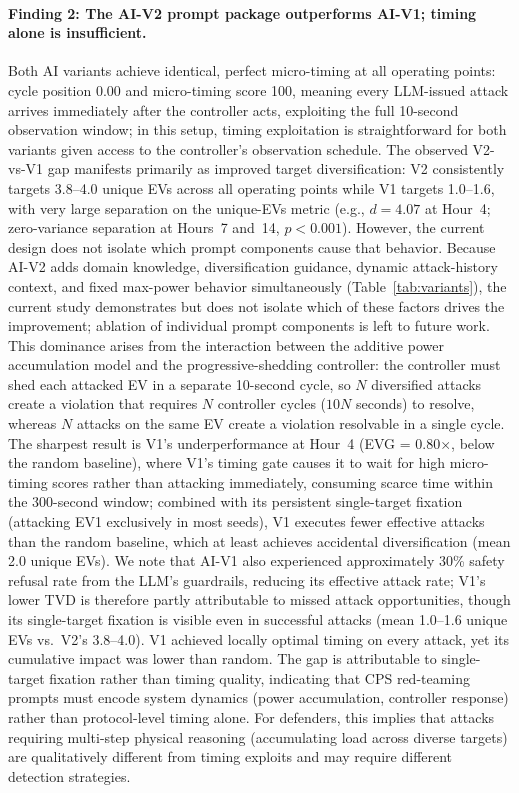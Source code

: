 \paragraph{Finding 2: The AI-V2 prompt package outperforms AI-V1; timing alone is insufficient.}
Both AI variants achieve identical, perfect micro-timing at all operating points: cycle position 0.00 and micro-timing score 100, meaning every LLM-issued attack arrives immediately after the controller acts, exploiting the full 10-second observation window; in this setup, timing exploitation is straightforward for both variants given access to the controller's observation schedule.
The observed V2-vs-V1 gap manifests primarily as improved target diversification: V2 consistently targets 3.8--4.0 unique EVs across all operating points while V1 targets 1.0--1.6, with very large separation on the unique-EVs metric (e.g., $d = 4.07$ at Hour~4; zero-variance separation at Hours~7 and~14, $p < 0.001$). However, the current design does not isolate which prompt components cause that behavior.
Because AI-V2 adds domain knowledge, diversification guidance, dynamic attack-history context, and fixed max-power behavior simultaneously (Table~\ref{tab:variants}), the current study demonstrates but does not isolate which of these factors drives the improvement; ablation of individual prompt components is left to future work.
This dominance arises from the interaction between the additive power accumulation model and the progressive-shedding controller: the controller must shed each attacked EV in a separate 10-second cycle, so $N$ diversified attacks create a violation that requires $N$ controller cycles ($10N$ seconds) to resolve, whereas $N$ attacks on the same EV create a violation resolvable in a single cycle.
The sharpest result is V1's underperformance at Hour~4 (EVG = 0.80$\times$, below the random baseline), where V1's timing gate causes it to wait for high micro-timing scores rather than attacking immediately, consuming scarce time within the 300-second window; combined with its persistent single-target fixation (attacking EV1 exclusively in most seeds), V1 executes fewer effective attacks than the random baseline, which at least achieves accidental diversification (mean 2.0 unique EVs).
We note that AI-V1 also experienced approximately 30\% safety refusal rate from the LLM's guardrails, reducing its effective attack rate; V1's lower TVD is therefore partly attributable to missed attack opportunities, though its single-target fixation is visible even in successful attacks (mean 1.0--1.6 unique EVs vs.\ V2's 3.8--4.0).
V1 achieved locally optimal timing on every attack, yet its cumulative impact was lower than random. The gap is attributable to single-target fixation rather than timing quality, indicating that CPS red-teaming prompts must encode system dynamics (power accumulation, controller response) rather than protocol-level timing alone.
For defenders, this implies that attacks requiring multi-step physical reasoning (accumulating load across diverse targets) are qualitatively different from timing exploits and may require different detection strategies.

